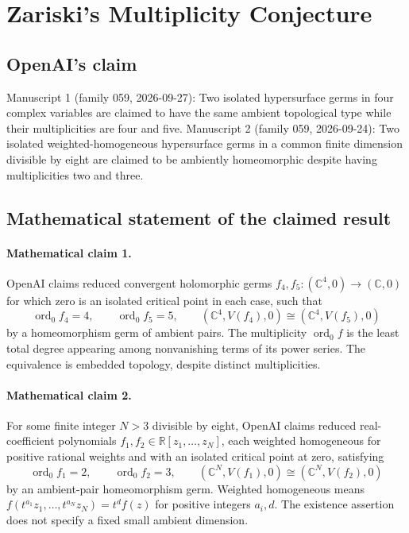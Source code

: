 \documentclass[11pt]{article}
\begin{document}
\section*{Zariski's Multiplicity Conjecture}

\subsection{OpenAI's claim}
Manuscript 1 (family 059, 2026-09-27): Two isolated hypersurface germs in four complex variables are claimed to have the same ambient topological type while their multiplicities are four and five. Manuscript 2 (family 059, 2026-09-24): Two isolated weighted-homogeneous hypersurface germs in a common finite dimension divisible by eight are claimed to be ambiently homeomorphic despite having multiplicities two and three.

\subsection{Mathematical statement of the claimed result}
\paragraph{Mathematical claim 1.} OpenAI claims reduced convergent holomorphic germs $f_4,f_5:(\mathbb C^4,0)\to(\mathbb C,0)$ for which zero is an isolated critical point in each case, such that
\[
\operatorname{ord}_0f_4=4,\qquad\operatorname{ord}_0f_5=5,\qquad
(\mathbb C^4,V(f_4),0)\cong(\mathbb C^4,V(f_5),0)
\]
by a homeomorphism germ of ambient pairs. The multiplicity $\operatorname{ord}_0f$ is the least total degree appearing among nonvanishing terms of its power series. The equivalence is embedded topology, despite distinct multiplicities.

\paragraph{Mathematical claim 2.} For some finite integer $N>3$ divisible by eight, OpenAI claims reduced real-coefficient polynomials $f_1,f_2\in\mathbb R[z_1,\ldots,z_N]$, each weighted homogeneous for positive rational weights and with an isolated critical point at zero, satisfying
\[
\operatorname{ord}_0f_1=2,\qquad\operatorname{ord}_0f_2=3,\qquad
(\mathbb C^N,V(f_1),0)\cong(\mathbb C^N,V(f_2),0)
\]
by an ambient-pair homeomorphism germ. Weighted homogeneous means $f(t^{a_1}z_1,\ldots,t^{a_N}z_N)=t^df(z)$ for positive integers $a_i,d$. The existence assertion does not specify a fixed small ambient dimension.
\end{document}
